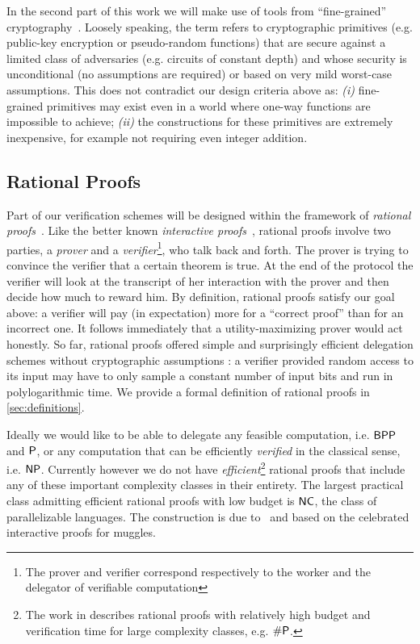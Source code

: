In the second part of this work we will make use of tools from ``fine-grained'' cryptography~\cite{fgcrypto}. Loosely speaking, the term refers to cryptographic primitives (e.g. public-key encryption or pseudo-random functions) that are secure against a limited class of adversaries (e.g. circuits of constant depth) and whose security is unconditional (no assumptions are required) or based on very mild worst-case assumptions. This does not contradict our design criteria above as: \textit{(i)} fine-grained primitives may exist even in a world  where one-way functions are impossible to achieve; \textit{(ii)} the constructions for these primitives are extremely inexpensive, for example not requiring even integer addition.


\subsection{Rational Proofs}

Part of our verification schemes will be designed within the framework of \textit{rational proofs}~\cite{am}. Like the better known \textit{interactive proofs}~\cite{gmr}, rational proofs involve two parties, a \textit{prover} and a \textit{verifier}\footnote{The prover and verifier correspond respectively to the worker and the delegator of verifiable computation}, who talk back and forth. The prover is trying to convince the verifier that a certain theorem is true. At the end of the protocol the verifier will look at the transcript of her interaction with the prover and then decide how much to reward him.
By definition, rational proofs satisfy our goal above: a verifier will pay (in expectation) more for a ``correct proof'' than for an incorrect one. It follows immediately that a utility-maximizing prover would act honestly.
So far, rational proofs offered simple and surprisingly efficient delegation schemes without cryptographic assumptions \cite{am1,ratargs,ratsumchecks}: a verifier provided random access to its input may have to only sample a constant number of input bits and run in polylogarithmic time. We provide a formal definition of rational proofs in \ref{sec:definitions}.

Ideally we would like to be able to delegate any feasible computation, i.e. $\BPP$ and $\P$, or any computation that can be efficiently  \textit{verified} in the classical sense, i.e. $\NP$. Currently however we do not have \textit{efficient}\footnote{The work in \cite{am} describes rational proofs with relatively high budget and verification time for large complexity classes, e.g. $\#\P$.} rational proofs that include any of these important complexity classes in their entirety. The largest practical class admitting efficient rational proofs with low budget is $\NC$, the class of parallelizable languages. The construction is due to~\cite{rationalsumchecks} and based on the celebrated interactive proofs for muggles\cite{muggles}.

